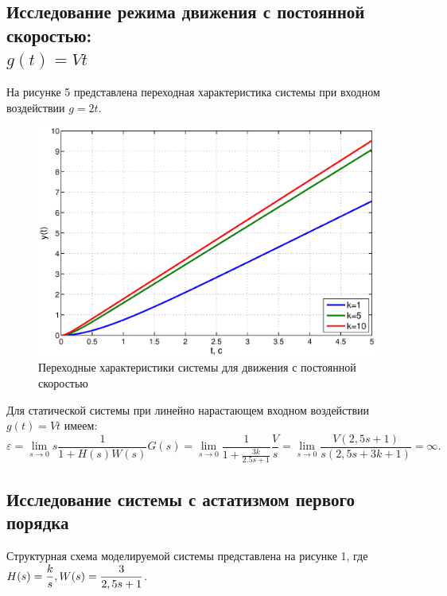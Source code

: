 \documentclass[12pt,a4paper]{article}
\begin{document}
\subsection{Исследование режима движения с постоянной скоростью: \\$g(t)=Vt$} 
На рисунке 5 представлена переходная характеристика системы при входном воздействии $g=2t$.
\begin{figure}[H]
	\centering
	\includegraphics[width=1\linewidth]{1.2.eps}
	\caption{Переходные характеристики системы для движения с постоянной скоростью}
\end{figure}
Для статической системы при линейно нарастающем входном воздействии $g(t)=Vt$ имеем:
\begin{equation}
    \varepsilon = \lim_{s\to0} s\frac{1}{1+H(s)W(s)}G(s) = \lim_{s\to0} \frac{1}{1+\displaystyle{\frac{3k}{2.5s+1}}}\frac{V}{s} = \lim_{s\to0} \frac{V(2,5s+1)}{s(2,5s+3k+1)} = \infty.
\end{equation}

\newpage
\begin{center}
\section{Исследование системы с астатизмом первого порядка}
\end{center}\par
Структурная схема моделируемой системы представлена на рисунке 1, где $H(s) = \displaystyle{\frac{k}{s}},\\ W(s)=\displaystyle{\frac{3}{2,5s + 1}}$.
\end{document}
